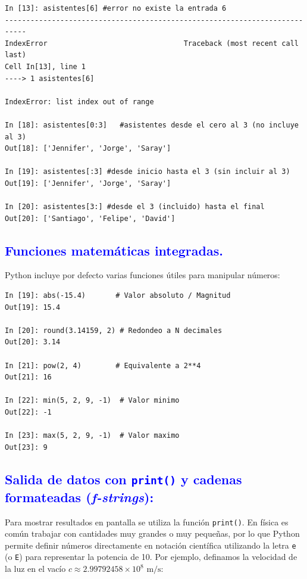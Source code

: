 \documentclass[12pt]{article}
\begin{document}
\begin{lstlisting}
In [13]: asistentes[6] #error no existe la entrada 6
---------------------------------------------------------------------------
IndexError                                Traceback (most recent call last)
Cell In[13], line 1
----> 1 asistentes[6]

IndexError: list index out of range

In [18]: asistentes[0:3]   #asistentes desde el cero al 3 (no incluye al 3)
Out[18]: ['Jennifer', 'Jorge', 'Saray']

In [19]: asistentes[:3] #desde inicio hasta el 3 (sin incluir al 3)
Out[19]: ['Jennifer', 'Jorge', 'Saray']

In [20]: asistentes[3:] #desde el 3 (incluido) hasta el final
Out[20]: ['Santiago', 'Felipe', 'David']
\end{lstlisting}


\subsection*{\textcolor{blue}{Funciones matemáticas integradas.}}

Python incluye por defecto varias funciones útiles para manipular números:

\begin{lstlisting}
In [19]: abs(-15.4)       # Valor absoluto / Magnitud
Out[19]: 15.4

In [20]: round(3.14159, 2) # Redondeo a N decimales
Out[20]: 3.14

In [21]: pow(2, 4)        # Equivalente a 2**4
Out[21]: 16

In [22]: min(5, 2, 9, -1)  # Valor minimo
Out[22]: -1

In [23]: max(5, 2, 9, -1)  # Valor maximo
Out[23]: 9
\end{lstlisting}


\subsection*{\textcolor{blue}{Salida de datos con \texttt{print()} y cadenas 
formateadas (\textit{f-strings}):}}

Para mostrar resultados en pantalla se utiliza la función \texttt{print()}. 
En física es común trabajar con cantidades muy grandes o muy pequeñas, por lo que Python 
permite definir números directamente en notación científica utilizando la letra \texttt{e} 
(o \texttt{E}) para representar la potencia de 10. Por ejemplo, definamos la velocidad de la luz en 
el vacío $c \approx 2.99792458 \times 10^8 \text{ m/s}$:
\end{document}
